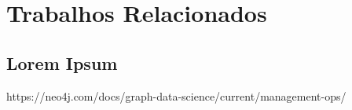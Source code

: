 \chapter{Trabalhos Relacionados}
\label{chap2}

\section{Lorem Ipsum}
https://neo4j.com/docs/graph-data-science/current/management-ops/